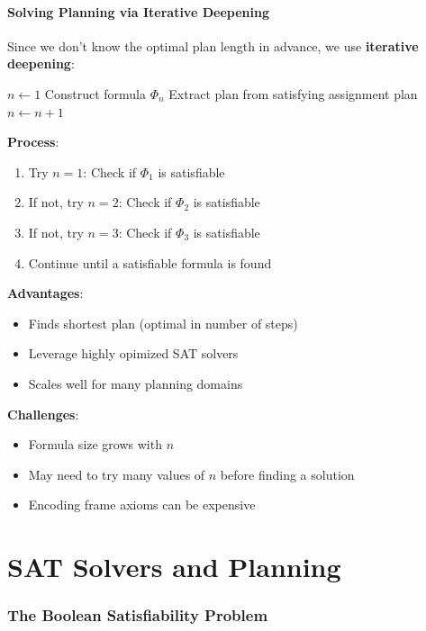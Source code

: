 \documentclass[a4paper]{article}
\theoremstyle{definition}
\begin{document}
\subsection{Solving Planning via Iterative Deepening}
Since we don't know the optimal plan length in advance, we use \textbf{iterative deepening}:
\begin{algorithm}[H]
    \caption{Planning via SAT with Iterative Deepening}
    \begin{algorithmic}[1]
      \State \( n \leftarrow 1 \)
        \State Construct formula \( \Phi_{n} \)
          \State Extract plan from satisfying assignment
          \State \Return plan
        \EndIf
        \State \( n \leftarrow n + 1 \)
      \EndWhile
    \end{algorithmic}
\end{algorithm}
\textbf{Process}:
\begin{enumerate}
    \item Try \( n = 1 \): Check if \( \Phi_{1} \) is satisfiable 
    \item If not, try \( n = 2 \): Check if \( \Phi_2 \) is satisfiable 
    \item If not, try \( n = 3 \): Check if \( \Phi_3 \) is satisfiable 
    \item Continue until a satisfiable formula is found 
\end{enumerate}
\textbf{Advantages}:
\begin{itemize}
    \item Finds shortest plan (optimal in number of steps)
    \item Leverage highly opimized SAT solvers 
    \item Scales well for many planning domains 
\end{itemize}
\textbf{Challenges}:
\begin{itemize}
    \item Formula size grows with $n$ 
    \item May need to try many values of \( n \) before finding a solution 
    \item Encoding frame axioms can be expensive 
\end{itemize}
\part{SAT Solvers and Planning}
\section{The Boolean Satisfiability Problem}
\end{document}
